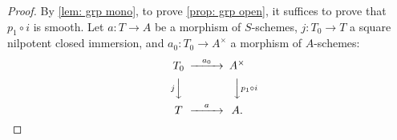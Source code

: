 \documentclass{amsart}
\begin{document}
\begin{proof}
  By \autoref{lem: grp mono}, to prove \autoref{prop: grp open},
  it suffices to prove that \(p_1\circ i\) is smooth.
  Let \(a:T\to A\) be a morphism of \(S\)-schemes,
  \(j:T_0\to T\) a square nilpotent closed immersion, and
  \(a_0:T_0\to A^{\times}\) a morphism of \(A\)-schemes:
  \[
  \begin{CD}
    T_0 @>{a_0}>> A^{\times} \\
    @V{j}VV @VV{p_1\circ i}V \\
    T @>{a}>> A.
  \end{CD}
  \]

\end{proof}





\printbibliography
\end{document}
